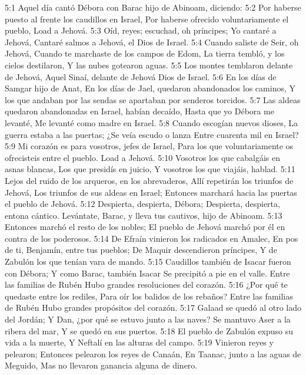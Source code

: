 5:1 Aquel día cantó Débora con Barac hijo de Abinoam, diciendo:  
5:2 Por haberse puesto al frente los caudillos en Israel,  
Por haberse ofrecido voluntariamente el pueblo,  
Load a Jehová.  
5:3 Oíd, reyes; escuchad, oh príncipes;  
Yo cantaré a Jehová,  
Cantaré salmos a Jehová, el Dios de Israel.  
5:4 Cuando saliste de Seir, oh Jehová,  
Cuando te marchaste de los campos de Edom,  
La tierra tembló, y los cielos destilaron,  
Y las nubes gotearon aguas. 
5:5 Los montes temblaron delante de Jehová,  
Aquel Sinaí, delante de Jehová Dios de Israel. 
5:6 En los días de Samgar hijo de Anat,  
En los días de Jael, quedaron abandonados los caminos,  
Y los que andaban por las sendas se apartaban por senderos torcidos.  
5:7 Las aldeas quedaron abandonadas en Israel, habían decaído,  
Hasta que yo Débora me levanté,  
Me levanté como madre en Israel. 
5:8 Cuando escogían nuevos dioses,  
La guerra estaba a las puertas;  
¿Se veía escudo o lanza  
Entre cuarenta mil en Israel? 
5:9 Mi corazón es para vosotros, jefes de Israel,  
Para los que voluntariamente os ofrecisteis entre el pueblo.  
Load a Jehová.  
5:10 Vosotros los que cabalgáis en asnas blancas,  
Los que presidís en juicio,  
Y vosotros los que viajáis, hablad.  
5:11 Lejos del ruido de los arqueros, en los abrevaderos,  
Allí repetirán los triunfos de Jehová,  
Los triunfos de sus aldeas en Israel;  
Entonces marchará hacia las puertas el pueblo de Jehová.  
5:12 Despierta, despierta, Débora;  
Despierta, despierta, entona cántico.  
Levántate, Barac, y lleva tus cautivos, hijo de Abinoam.  
5:13 Entonces marchó el resto de los nobles;  
El pueblo de Jehová marchó por él en contra de los poderosos.  
5:14 De Efraín vinieron los radicados en Amalec,  
En pos de ti, Benjamín, entre tus pueblos;  
De Maquir descendieron príncipes,  
Y de Zabulón los que tenían vara de mando.  
5:15 Caudillos también de Isacar fueron con Débora;  
Y como Barac, también Isacar  
Se precipitó a pie en el valle.  
Entre las familias de Rubén  
Hubo grandes resoluciones del corazón.  
5:16 ¿Por qué te quedaste entre los rediles,  
Para oír los balidos de los rebaños?  
Entre las familias de Rubén  
Hubo grandes propósitos del corazón. 
5:17 Galaad se quedó al otro lado del Jordán;  
Y Dan, ¿por qué se estuvo junto a las naves?  
Se mantuvo Aser a la ribera del mar,  
Y se quedó en sus puertos.  
5:18 El pueblo de Zabulón expuso su vida a la muerte,  
Y Neftalí en las alturas del campo.  
5:19 Vinieron reyes y pelearon;  
Entonces pelearon los reyes de Canaán,  
En Taanac, junto a las aguas de Meguido,  
Mas no llevaron ganancia alguna de dinero.  
